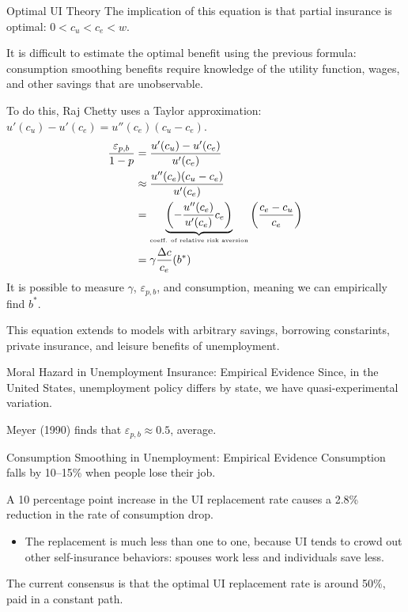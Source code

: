 \documentclass[10pt]{extarticle}
\begin{document}
\begin{problem}{Optimal UI Theory}
    The implication of this equation is that partial insurance is optimal: $0 < c_u < c_e < w$.\newline

    It is difficult to estimate the optimal benefit using the previous formula: consumption smoothing benefits require knowledge of the utility function, wages, and other savings that are unobservable.\newline

    To do this, Raj Chetty uses a Taylor approximation: $u'(c_u) - u'(c_e) = u''(c_e)(c_u - c_e)$.
    \begin{align*}
      \frac{\varepsilon_{p,b}}{1-p} &= \frac{u'(c_u) - u'(c_e)}{u'(c_e)}\\
                                    &\approx \frac{u''(c_e)(c_u - c_e)}{u'(c_e)}\\
                                    &= \underbrace{\left(-\frac{u''(c_e)}{u'(c_e)}c_e\right)}_{\text{\tiny coeff. of relative risk aversion}}\left(\frac{c_e - c_u}{c_e}\right)\\
                                    &= \gamma \frac{\Delta c}{c_e}(b^*)
    \end{align*}
    It is possible to measure $\gamma$, $\varepsilon_{p,b}$, and consumption, meaning we can empirically find $b^*$.\newline

    This equation extends to models with arbitrary savings, borrowing constarints, private insurance, and leisure benefits of unemployment.
    \begin{problem}{Moral Hazard in Unemployment Insurance: Empirical Evidence}
      Since, in the United States, unemployment policy differs by state, we have quasi-experimental variation.\newline

      Meyer (1990) finds that $\varepsilon_{p,b} \approx 0.5$, average.
    \end{problem}
    \begin{problem}{Consumption Smoothing in Unemployment: Empirical Evidence}
      Consumption falls by 10--15\% when people lose their job.\newline

      A 10 percentage point increase in the UI replacement rate causes a 2.8\% reduction in the rate of consumption drop.
      \begin{itemize}
        \item The replacement is much less than one to one, because UI tends to crowd out other self-insurance behaviors: spouses work less and individuals save less.
      \end{itemize}
    \end{problem}
    The current consensus is that the optimal UI replacement rate is around 50\%, paid in a constant path.
  \end{problem}
\end{document}
